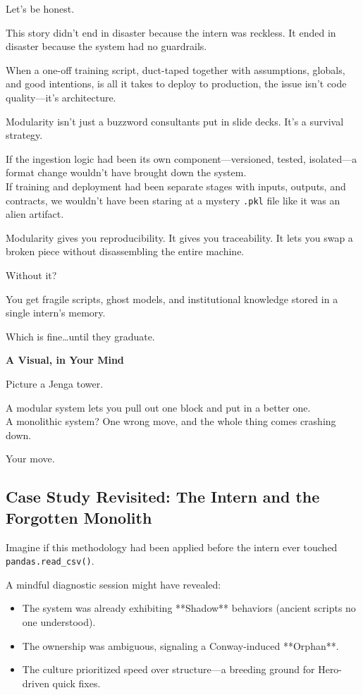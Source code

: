 Let’s be honest.

This story didn’t end in disaster because the intern was reckless.  It ended in disaster because the system had no guardrails.

When a one-off training script, duct-taped together with assumptions, globals, and good intentions, is all it takes to deploy to production, the issue isn’t code quality---it’s architecture.

Modularity isn’t just a buzzword consultants put in slide decks.  It’s a survival strategy.

If the ingestion logic had been its own component---versioned, tested, isolated---a format change wouldn’t have brought down the system.\\
If training and deployment had been separate stages with inputs, outputs, and contracts, we wouldn’t have been staring at a mystery \texttt{.pkl} file like it was an alien artifact.

Modularity gives you reproducibility.  It gives you traceability. It lets you swap a broken piece without disassembling the entire machine.

Without it?

You get fragile scripts, ghost models, and institutional knowledge stored in a single intern’s memory.

Which is fine\ldots until they graduate.


\vspace{1em}
\textbf{A Visual, in Your Mind}

Picture a Jenga tower.

A modular system lets you pull out one block and put in a better one.\\
A monolithic system? One wrong move, and the whole thing comes crashing down.

Your move.

\subsection{Case Study Revisited: The Intern and the Forgotten Monolith}

Imagine if this methodology had been applied before the intern ever touched \texttt{pandas.read\_csv()}.

A mindful diagnostic session might have revealed:
\begin{itemize}
    \item The system was already exhibiting **Shadow** behaviors (ancient scripts no one understood).
    \item The ownership was ambiguous, signaling a Conway-induced **Orphan**.
    \item The culture prioritized speed over structure—a breeding ground for Hero-driven quick fixes.
\end{itemize}


